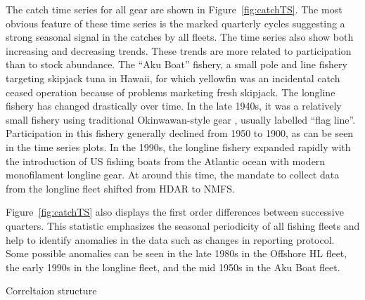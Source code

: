 \documentclass[12pt,letterpaper]{article}
\newcommand\help[1]{\color{Magenta}{\it #1 }\normalcolor}
\begin{document}
The catch time series for all gear are shown in
Figure~\ref{fig:catchTS}. The most obvious feature of these time
series is the marked quarterly cycles suggesting a strong seasonal
signal in the catches by all fleets.
The time series also show both increasing and decreasing trends. These
trends are more related to participation than to stock abundance.
The ``Aku Boat'' fishery, a small pole and line fishery
targeting skipjack tuna in Hawaii, for which yellowfin was an
incidental catch ceased operation because of
problems marketing fresh skipjack.
The longline fishery has changed drastically over time. In the late
1940s, it was a relatively small fishery using traditional
Okinwawan-style gear \help{(reference)}, usually labelled ``flag
line''. Participation in this fishery generally declined from 1950 to
1900, as can be seen in the time series plots. In the 1990s, the longline
fishery expanded rapidly with the introduction of US fishing boats
from the Atlantic ocean with modern monofilament longline gear. At
around this time, the mandate to collect data from the longline fleet
shifted from HDAR to NMFS.
\help{What happened to the Inshore HL fleet?}

Figure~\ref{fig:catchTS} also displays the first order differences
between successive quarters. This statistic emphasizes the seasonal
periodicity of all fishing fleets and help to identify anomalies in
the data such as changes in reporting protocol. Some possible
anomalies can be seen in the late 1980s in the Offshore HL fleet, the
early 1990s in the longline fleet, and the mid 1950s in the Aku Boat
fleet. 
\help{The 1990s longline anomaly is expected and will be rectified
with the NMFS data become available.}

Correltaion structure
\end{document}
